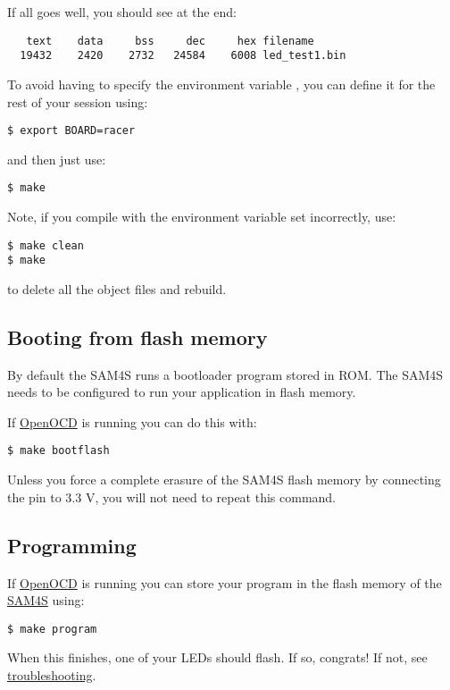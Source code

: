 If all goes well, you should see at the end:
%
\begin{verbatim}
   text    data     bss     dec     hex filename
  19432    2420    2732   24584    6008 led_test1.bin
\end{verbatim}

To avoid having to specify the environment variable , you
can define it for the rest of your session using:
%
\begin{verbatim}
$ export BOARD=racer
\end{verbatim}
%
and then just use:
%
\begin{verbatim}
$ make
\end{verbatim}

Note, if you compile with the  environment variable set incorrectly, use:
%
\begin{verbatim}
$ make clean
$ make  
\end{verbatim}
%
to delete all the object files and rebuild.


\subsection{Booting from flash memory}
\label{booting-from-flash-memory}

By default the SAM4S runs a bootloader program stored in ROM. The SAM4S
needs to be configured to run your application in flash memory.

If \url{OpenOCD} is running you can do this with:

\begin{verbatim}
$ make bootflash
\end{verbatim}

Unless you force a complete erasure of the SAM4S flash memory by
connecting the  pin to 3.3 V, you will not need to repeat
this command.

\subsection{Programming}
\label{programming}

If \url{OpenOCD} is running you can store your program in the flash
memory of the \url{SAM4S} using:

\begin{verbatim}
$ make program
\end{verbatim}

When this finishes, one of your LEDs should flash. If so, congrats! If
not, see \protect\hyperref[troubleshooting]{troubleshooting}.

